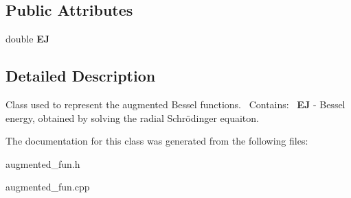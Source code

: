 \subsection*{Public Attributes}
\begin{DoxyCompactItemize}
\item 
\mbox{\label{classAugmented__Bessel_af315b52b31edc3e70bcd137b3f545498}} 
double {\bfseries EJ}
\end{DoxyCompactItemize}


\subsection{Detailed Description}
Class used to represent the augmented Bessel functions.~\newline
Contains\+:~\newline
{\bfseries EJ} -\/ Bessel energy, obtained by solving the radial Schrödinger equaiton.~\newline


The documentation for this class was generated from the following files\+:\begin{DoxyCompactItemize}
\item 
augmented\+\_\+fun.\+h\item 
augmented\+\_\+fun.\+cpp\end{DoxyCompactItemize}
